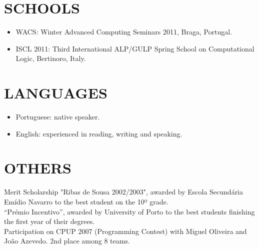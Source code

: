 \documentclass[margin]{res}
\begin{document}
\begin{resume}
\section{SCHOOLS}
   \begin{itemize}
      \item WACS: Winter Advanced Computing Seminars 2011, Braga, Portugal.
      \item ISCL 2011: Third International ALP/GULP Spring School on Computational Logic, Bertinoro, Italy.
   \end{itemize}

\section{LANGUAGES}
      \begin{itemize}
        \item Portuguese: native speaker.
        \item English: experienced in reading, writing and speaking.
      \end{itemize}

\section{OTHERS} Merit Scholarship "Ribas de Sousa 2002/2003", awarded by Escola Secundária Emídio Navarro to the best student on the 10º grade. \\
                  “Prémio Incentivo”, awarded by University of Porto to the best students finishing the first year of their degrees. \\
                  Participation on CPUP 2007 (Programming Contest) with Miguel Oliveira and João Azevedo. 2nd place among 8 teams. \\
                  

\end{resume}
\end{document}
